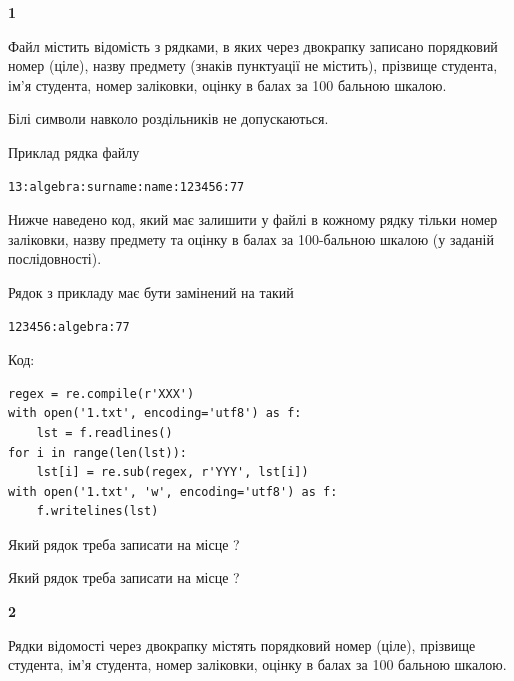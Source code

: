 {\begin {center}\textbf{ 1}\end {center}}\par
Файл  містить відомість з рядками, в яких через двокрапку записа\-но поряд\-ковий номер (ціле), назву предмету (знаків пунктуації не містить), прізвище студента, ім'я студента, номер заліковки, оцінку в балах за 100 бальною шкалою.

Білі символи навколо роздільників не допускаються.

Приклад рядка файлу



\begin{verbatim}
13:algebra:surname:name:123456:77
\end{verbatim}


Нижче наведено код, який має залишити у файлі в кожному рядку тільки номер заліковки, назву предмету та оцінку в балах за 100-бальною шкалою (у заданій послі\-дов\-ності).

Рядок з прикладу має бути замінений на такий



\begin{verbatim}
123456:algebra:77
\end{verbatim}




Код:



\begin{verbatim}
regex = re.compile(r'XXX')
with open('1.txt', encoding='utf8') as f:
    lst = f.readlines()
for i in range(len(lst)):
    lst[i] = re.sub(regex, r'YYY', lst[i])
with open('1.txt', 'w', encoding='utf8') as f:
    f.writelines(lst)
\end{verbatim}







Який рядок треба записати на місце  ?\par
\vspace{5mm}


Який рядок треба записати на місце  ?\par


\newpage

{\begin {center}\textbf{ 2}\end {center}}\par
Рядки відомості через двокрапку містять порядковий номер (ціле), пріз\-ви\-ще студен\-та, ім'я студента, номер заліковки, оцінку в балах за 100 бальною шкалою.

